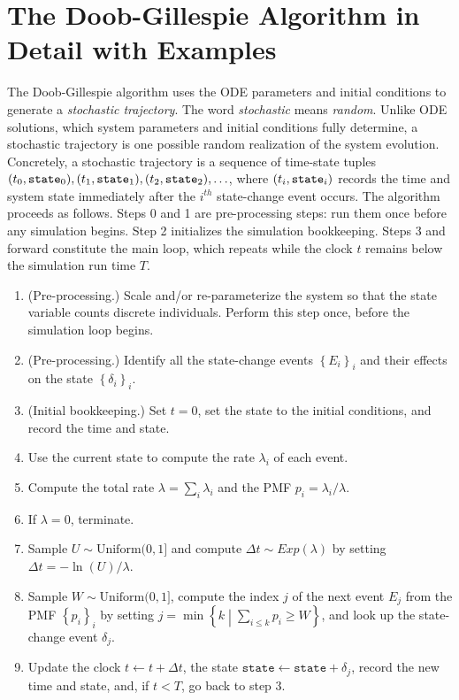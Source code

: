\section{The Doob-Gillespie Algorithm in Detail with Examples}\label{sec:algorithm}


The Doob-Gillespie algorithm uses the ODE parameters and initial conditions to generate a \textit{stochastic trajectory}. The word \textit{stochastic} means \textit{random}. Unlike ODE solutions, which system parameters and initial conditions fully determine, a stochastic trajectory is one possible random realization of the system evolution. Concretely, a stochastic trajectory is a sequence of time-state tuples $(t_0, {\tt state}_0), (t_1, {\tt state}_1), (t_2, {\tt state}_2), \ldots$, where $(t_i, {\tt state}_i)$ records the time and system state immediately after the $i^{th}$ state-change event occurs. The algorithm proceeds as follows. Steps 0 and 1 are pre-processing steps: run them once before any simulation begins. Step 2 initializes the simulation bookkeeping. Steps 3 and forward constitute the main loop, which repeats while the clock $t$ remains below the simulation run time $T$.
\begin{enumerate}
\item[\textbf{Step 0.}] (Pre-processing.) Scale and/or re-parameterize the system so that the state variable counts discrete individuals. Perform this step once, before the simulation loop begins.
\item[\textbf{Step 1.}] (Pre-processing.) Identify all the state-change events $\left\{E_i\right\}_i$ and their effects on the state $\left\{\delta_i\right\}_i$.
\item[\textbf{Step 2.}] (Initial bookkeeping.) Set $t = 0$, set the state to the initial conditions, and record the time and state.
\item[\textbf{Step 3.}] Use the current state to compute the rate $\lambda_i$ of each event.
\item[\textbf{Step 4.}] Compute the total rate $\lambda = \sum_i \lambda_i$ and the PMF $p_i = \lambda_i/\lambda$.
\item[\textbf{Step 5.}]   If $\lambda = 0$, terminate. 
\item[\textbf{Step 6.}] Sample $U \sim \text{Uniform}(0,1]$ and compute $\Delta t \sim Exp(\lambda)$ by setting $\Delta t = -\ln(U)/\lambda$.
\item[\textbf{Step 7.}] Sample $W \sim \text{Uniform}(0,1]$, compute the index $j$ of the next event $E_j$ from the PMF $\left\{p_i\right\}_i$ by setting $j = \min\left\{k \middle| \sum_{i \leq k} p_i \geq W\right\}$, and look up the state-change event $\delta_j$.
\item[\textbf{Step 8.}] Update the clock $t \leftarrow t + \Delta t$, the state $\texttt{state} \leftarrow \texttt{state} + \delta_j$, record the new time and state, and, if $t < T$, go back to step 3.
\end{enumerate}


